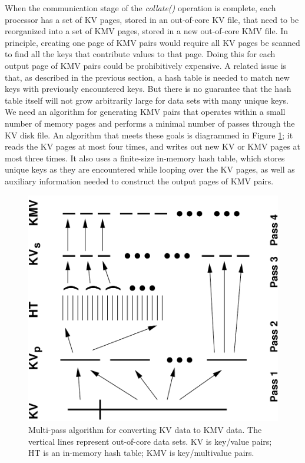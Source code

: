When the communication stage of the {\it collate()} operation is
complete, each processor has a set of KV pages, stored in an
out-of-core KV file, that need to be reorganized into a set of KMV
pages, stored in a new out-of-core KMV file.  In principle, 
creating one page of KMV pairs would require all KV pages be scanned
to find all the keys that contribute values to that page.  Doing this
for each output page of KMV pairs could be prohibitively expensive.  A
related issue is that, as described in the previous section, a hash
table is needed to match new keys with previously encountered keys.
But there is no guarantee that the hash table itself will not grow
arbitrarily large for data sets with many unique keys.  We need an
algorithm for generating KMV pairs that operates within a small
number of memory pages and performs a minimal number of passes through
the KV disk file.  An algorithm that meets these goals is diagrammed
in Figure \ref{fig:collate}; it reads the KV pages at most four times, and
writes out new KV or KMV pages at most three times.  It also uses a
finite-size in-memory hash table, which stores unique keys as they are
encountered while looping over the KV pages, as well as auxiliary
information needed to construct the output pages of KMV pairs.

\begin{figure}
\includegraphics[width=\textwidth,angle=-90]{fig_collate2.pdf}
\caption{Multi-pass algorithm for converting KV data to KMV data.  The
vertical lines represent out-of-core data sets.  KV is key/value
pairs; HT is an in-memory hash table; KMV is key/multivalue pairs.}
\label{fig:collate}
\end{figure}

